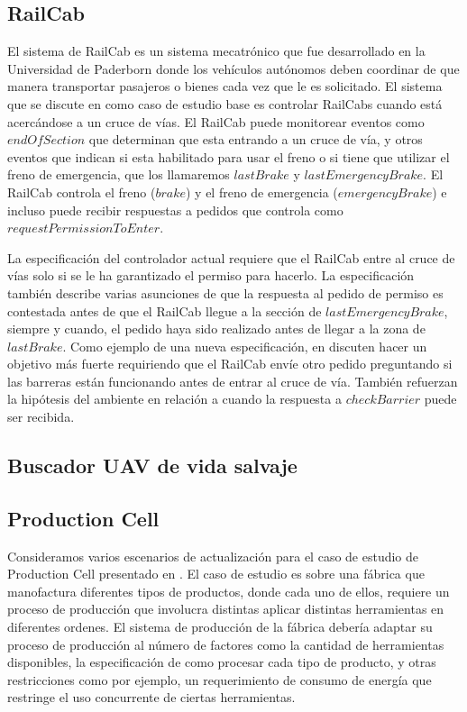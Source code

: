 \subsection{RailCab}

El sistema de RailCab es un sistema mecatrónico que fue desarrollado en la Universidad de Paderborn \cite{railcab} donde
los vehículos autónomos deben coordinar de que manera transportar pasajeros o bienes cada vez que le es solicitado. El
sistema que se discute en \cite{6224401} como caso de estudio base es controlar RailCabs cuando está acercándose a un
cruce de vías. El RailCab puede monitorear eventos como $endOfSection$ que determinan que esta entrando a un cruce de
vía, y otros eventos que indican si esta habilitado para usar el freno o si tiene que utilizar el freno de emergencia,
que los llamaremos $lastBrake$ y $lastEmergencyBrake$. El RailCab controla el freno ($brake$) y el freno de emergencia
($emergencyBrake$) e incluso puede recibir respuestas a pedidos que controla como $requestPermissionToEnter$.

La especificación del controlador actual requiere que el RailCab entre al cruce de vías solo si se le ha garantizado el
permiso para hacerlo. La especificación también describe varias asunciones de que la respuesta al pedido de permiso es
contestada antes de que el RailCab llegue a la sección de $lastEmergencyBrake$, siempre y cuando, el pedido haya sido
realizado antes de llegar a la zona de $lastBrake$. Como ejemplo de una nueva especificación, en \cite{6224401} discuten
hacer un objetivo más fuerte requiriendo que el RailCab envíe otro pedido preguntando si las barreras están funcionando
antes de entrar al cruce de vía. También refuerzan la hipótesis del ambiente en relación a cuando la respuesta a
$checkBarrier$ puede ser recibida.

\subsection{Buscador UAV de vida salvaje}
\label{buscador_UAV}


\subsection{Production Cell}

Consideramos varios escenarios de actualización para el caso de estudio de Production Cell presentado en
\cite{Lewerentz:1995:646391}. El caso de estudio es sobre una fábrica que manofactura diferentes tipos de productos,
donde cada uno de ellos, requiere un proceso de producción que involucra distintas aplicar distintas herramientas en
diferentes ordenes. El sistema de producción de la fábrica debería adaptar su proceso de producción al número de
factores como la cantidad de herramientas disponibles, la especificación de como procesar cada tipo de producto, y otras
restricciones como por ejemplo, un requerimiento de consumo de energía que restringe el uso concurrente de ciertas
herramientas.

